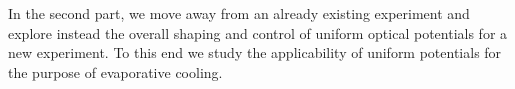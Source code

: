 In the second part, we move away from an already existing experiment and explore instead the overall shaping and control of uniform optical potentials for a new experiment. To this end we study the applicability of uniform potentials for the purpose of evaporative cooling.



